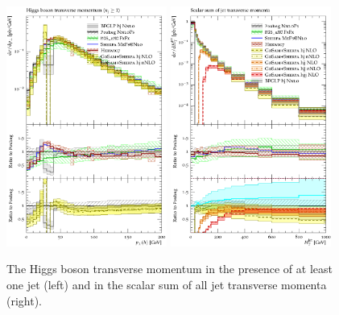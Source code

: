 \begin{figure}[t!]
  \centering
  \includegraphics[width=0.47\textwidth]{figures/hjetscomp_H_j_pT_incl.pdf}
  \quad
  \includegraphics[width=0.47\textwidth]{figures/hjetscomp_HT_jets.pdf}
  \caption{
    The Higgs boson transverse momentum in the presence of at least one 
    jet (left) and in the scalar sum of all jet transverse momenta (right).
    \label{fig:higgscomp:results:1obs:hpt_ht}
  }
\end{figure}

